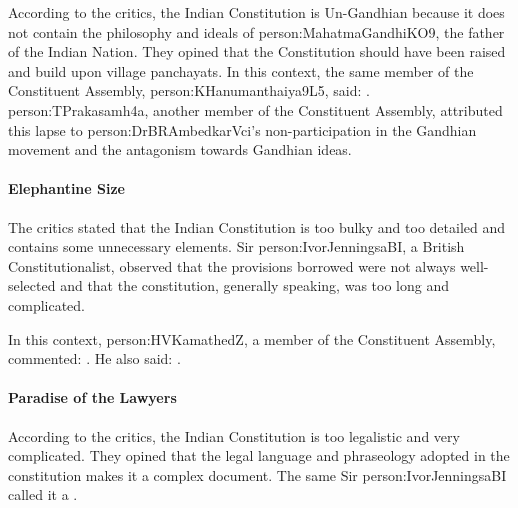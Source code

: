 According to the critics, the Indian Constitution is Un-Gandhian because it does not contain the philosophy and ideals of \gls{person:MahatmaGandhiKO9}, the father of the Indian Nation. They opined that the Constitution should have been raised and build upon village panchayats. In this context, the same member of the Constituent Assembly, \gls{person:KHanumanthaiya9L5}, said: . \gls{person:TPrakasamh4a}, another member of the Constituent Assembly, attributed this lapse to \gls{person:DrBRAmbedkarVci}'s non-participation in the Gandhian movement and the antagonism towards Gandhian ideas.

\paragraph{Elephantine Size}

The critics stated that the Indian Constitution is too bulky and too detailed and contains some unnecessary elements. Sir \gls{person:IvorJenningsaBI}, a British Constitutionalist, observed that the provisions borrowed were not always well-selected and that the constitution, generally speaking, was too long and complicated.

In this context, \gls{person:HVKamathedZ}, a member of the Constituent Assembly, commented: . He also said: .

\paragraph{Paradise of the Lawyers}

According to the critics, the Indian Constitution is too legalistic and very complicated. They opined that the legal language and phraseology adopted in the constitution makes it a complex document. The same Sir \gls{person:IvorJenningsaBI} called it a .

